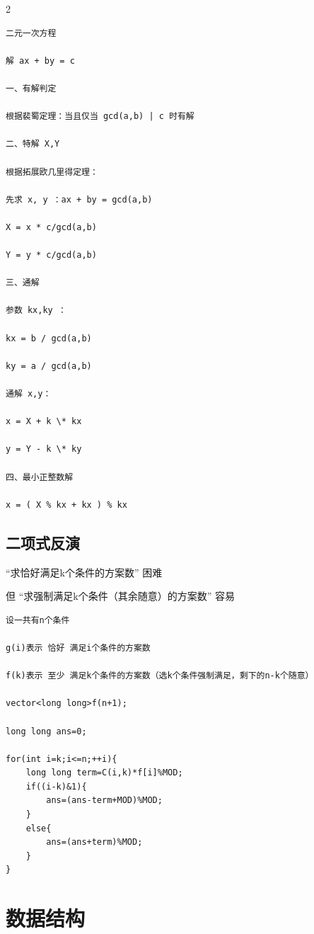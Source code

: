 \documentclass[10pt,a4paper]{article}
\begin{document}
\begin{multicols*}{2}
\begin{lstlisting}
二元一次方程

解 ax + by = c

一、有解判定

根据裴蜀定理：当且仅当 gcd(a,b) | c 时有解

二、特解 X,Y

根据拓展欧几里得定理：

先求 x, y ：ax + by = gcd(a,b)

X = x * c/gcd(a,b)

Y = y * c/gcd(a,b)

三、通解

参数 kx,ky ：

kx = b / gcd(a,b)

ky = a / gcd(a,b)

通解 x,y：

x = X + k \* kx

y = Y - k \* ky

四、最小正整数解

x = ( X % kx + kx ) % kx
\end{lstlisting}

\subsection{二项式反演}
“求恰好满足k个条件的方案数” 困难

但 “求强制满足k个条件（其余随意）的方案数” 容易

\begin{lstlisting}
设一共有n个条件

g(i)表示 恰好 满足i个条件的方案数

f(k)表示 至少 满足k个条件的方案数（选k个条件强制满足，剩下的n-k个随意） 

vector<long long>f(n+1); 

long long ans=0;

for(int i=k;i<=n;++i){
    long long term=C(i,k)*f[i]%MOD;
    if((i-k)&1){
        ans=(ans-term+MOD)%MOD;
    }
    else{
        ans=(ans+term)%MOD;
    }
}

\end{lstlisting}
\columnbreak
\section{数据结构}

\end{multicols*}
\end{document}
